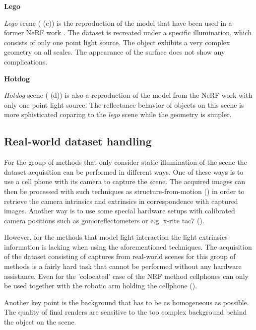 \textbf{Lego}

\textit{Lego} scene ( (c)) is the reproduction of the model
that have been used in a former NeRF work \cite{mildenhall2020nerf}.
The dataset is recreated under a specific illumination,
which consists of only one point light source.
The object exhibits a very complex geometry on all scales.
The appearance of the surface does not show any complications.

\textbf{Hotdog}

\textit{Hotdog} scene ( (d)) is also a reproduction of the model
from the NeRF work with only one point light source.
The reflectance behavior of objects on this scene is more sphisticated
coparing to the \textit{lego} scene while the geometry is simpler.


\subsection{Real-world dataset handling}

For the group of methods that only consider static illumination of the scene
the dataset acquisition can be performed in different ways.
One of these ways is to use a cell phone with its camera to capture the scene.
The acquired images can then be processed with such techniques as
structure-from-motion (\cite{Moulon2012, Jancosek2011, schoenberger2016structure})
in order to retrieve the camera intrinsics and extrinsics in correspondence with captured images.
Another way is to use some special hardware setups with calibrated camera positions
such as gonioreflectometers or e.g. x-rite tac7 (\cite{merzbach2017highquality}).

However, for the methods that model light interaction the light extrinsics information is lacking
when using the aforementioned techniques.
The acquisition of the dataset consisting of captures from real-world scenes
for this group of methods is a fairly hard task that cannot be performed without any hardware assistance.
Even for the 'colocated' case of the NRF method cellphones can only be used
together with the robotic arm holding the cellphone (\cite{bi2020neural}).

Another key point is the background that has to be as homogeneous as possible.
The quality of final renders are sensitive to the too complex background behind the object on the scene.




